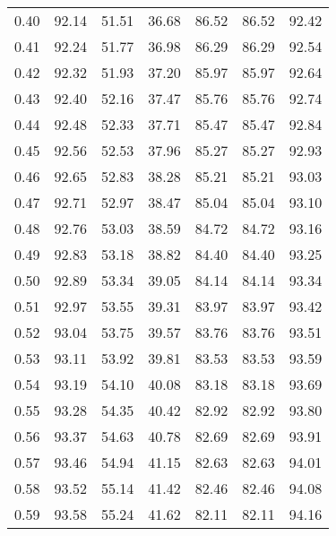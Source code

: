 \begin{tabular}{|c|c|c|c|c|c|c|}
      0.40 &     92.14 &     51.51 &      36.68 &   86.52 &      86.52 &         92.42 \\
      0.41 &     92.24 &     51.77 &      36.98 &   86.29 &      86.29 &         92.54 \\
      0.42 &     92.32 &     51.93 &      37.20 &   85.97 &      85.97 &         92.64 \\
      0.43 &     92.40 &     52.16 &      37.47 &   85.76 &      85.76 &         92.74 \\
      0.44 &     92.48 &     52.33 &      37.71 &   85.47 &      85.47 &         92.84 \\
      0.45 &     92.56 &     52.53 &      37.96 &   85.27 &      85.27 &         92.93 \\
      0.46 &     92.65 &     52.83 &      38.28 &   85.21 &      85.21 &         93.03 \\
      0.47 &     92.71 &     52.97 &      38.47 &   85.04 &      85.04 &         93.10 \\
      0.48 &     92.76 &     53.03 &      38.59 &   84.72 &      84.72 &         93.16 \\
      0.49 &     92.83 &     53.18 &      38.82 &   84.40 &      84.40 &         93.25 \\
      0.50 &     92.89 &     53.34 &      39.05 &   84.14 &      84.14 &         93.34 \\
      0.51 &     92.97 &     53.55 &      39.31 &   83.97 &      83.97 &         93.42 \\
      0.52 &     93.04 &     53.75 &      39.57 &   83.76 &      83.76 &         93.51 \\
      0.53 &     93.11 &     53.92 &      39.81 &   83.53 &      83.53 &         93.59 \\
      0.54 &     93.19 &     54.10 &      40.08 &   83.18 &      83.18 &         93.69 \\
      0.55 &     93.28 &     54.35 &      40.42 &   82.92 &      82.92 &         93.80 \\
      0.56 &     93.37 &     54.63 &      40.78 &   82.69 &      82.69 &         93.91 \\
      0.57 &     93.46 &     54.94 &      41.15 &   82.63 &      82.63 &         94.01 \\
      0.58 &     93.52 &     55.14 &      41.42 &   82.46 &      82.46 &         94.08 \\
      0.59 &     93.58 &     55.24 &      41.62 &   82.11 &      82.11 &         94.16 \\

\end{tabular}
